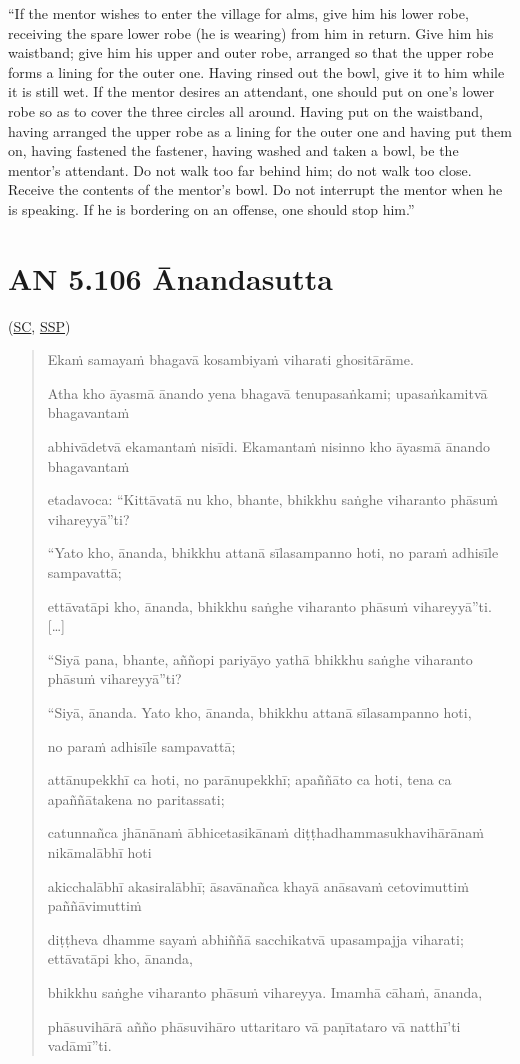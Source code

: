 \documentclass[11pt,oneside]{memoir}
\begin{document}
“If the mentor wishes to enter the village for alms, give him his lower robe,
receiving the spare lower robe (he is wearing) from him in return. Give him his
waistband; give him his upper and outer robe, arranged so that the upper robe
forms a lining for the outer one. Having rinsed out the bowl, give it to him
while it is still wet. If the mentor desires an attendant, one should put on
one's lower robe so as to cover the three circles all around. Having put on the
waistband, having arranged the upper robe as a lining for the outer one and
having put them on, having fastened the fastener, having washed and taken a
bowl, be the mentor's attendant. Do not walk too far behind him; do not walk too
close. Receive the contents of the mentor's bowl. Do not interrupt the mentor
when he is speaking. If he is bordering on an offense, one should stop him.”

\section{AN 5.106 Ānandasutta}
\label{sec:orgf11806a}

(\href{https://suttacentral.net/an5.106/pli/ms}{SC}, \href{http://localhost:4848/suttas/an5.106/pli/ms?window\_type=Sutta+Study}{SSP})

\begin{quote}
Ekaṁ samayaṁ bhagavā kosambiyaṁ viharati ghositārāme.

Atha kho āyasmā ānando yena bhagavā tenupasaṅkami; upasaṅkamitvā bhagavantaṁ

abhivādetvā ekamantaṁ nisīdi. Ekamantaṁ nisinno kho āyasmā ānando bhagavantaṁ

etadavoca: “Kittāvatā nu kho, bhante, bhikkhu saṅghe viharanto phāsuṁ vihareyyā”ti?

“Yato kho, ānanda, bhikkhu attanā sīlasampanno hoti, no paraṁ adhisīle sampavattā;

ettāvatāpi kho, ānanda, bhikkhu saṅghe viharanto phāsuṁ vihareyyā”ti. [\ldots{}]

“Siyā pana, bhante, aññopi pariyāyo yathā bhikkhu saṅghe viharanto phāsuṁ vihareyyā”ti?

“Siyā, ānanda. Yato kho, ānanda, bhikkhu attanā sīlasampanno hoti,

no paraṁ adhisīle sampavattā;

attānupekkhī ca hoti, no parānupekkhī; apaññāto ca hoti, tena ca apaññātakena no paritassati;

catunnañca jhānānaṁ ābhicetasikānaṁ diṭṭhadhammasukhavihārānaṁ nikāmalābhī hoti

akicchalābhī akasiralābhī; āsavānañca khayā anāsavaṁ cetovimuttiṁ paññāvimuttiṁ

diṭṭheva dhamme sayaṁ abhiññā sacchikatvā upasampajja viharati; ettāvatāpi kho, ānanda,

bhikkhu saṅghe viharanto phāsuṁ vihareyya. Imamhā cāhaṁ, ānanda,

phāsuvihārā añño phāsuvihāro uttaritaro vā paṇītataro vā natthī'ti vadāmī”ti.
\end{quote}
\end{document}
